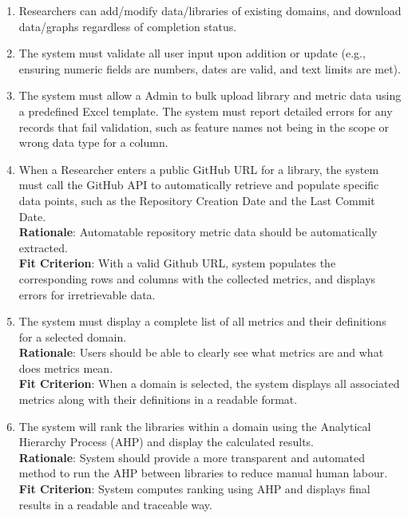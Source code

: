 \documentclass[12pt]{article}
\begin{document}
\begin{enumerate}[label=FR\arabic*]
  \\ \textbf{Rationale}: To allow for domains to be in different stages, and for open access once completed.
  \\ \textbf{Fit Criterion}: Unpublished domains cannot be seen by users. Published domains can be seen by users.
  \item Researchers can add/modify data/libraries of existing domains, and download data/graphs regardless of completion status.
  \item The system must validate all user input upon addition or update (e.g., ensuring numeric fields are numbers, dates are valid, and text limits are met).
  \item The system must allow a Admin to bulk upload library and metric data using a predefined Excel template. The system must report detailed errors for any records that fail validation, such as feature names not being in the scope or wrong data type for a column.
  \item When a Researcher enters a public GitHub URL for a library, the system must call the GitHub API to automatically retrieve and populate specific data points, such as the Repository Creation Date and the Last Commit Date.
  \\ \textbf{Rationale}: Automatable repository metric data should be automatically extracted.
  \\ \textbf{Fit Criterion}: With a valid Github URL, system populates the corresponding rows and columns with the collected metrics, and displays errors for irretrievable data.
  \item The system must display a complete list of all metrics and their definitions for a selected domain.
  \\ \textbf{Rationale}: Users should be able to clearly see what metrics are and what does metrics mean.
  \\ \textbf{Fit Criterion}: When a domain is selected, the system displays all associated metrics along with their definitions in a readable format.
  \item The system will rank the libraries within a domain using the Analytical Hierarchy Process (AHP) and display the calculated results.
  \\ \textbf{Rationale}: System should provide a more transparent and automated method to run the AHP between libraries to reduce manual human labour.
  \\ \textbf{Fit Criterion}: System computes ranking using AHP and displays final results in a readable and traceable way.

\end{enumerate}
\end{document}
